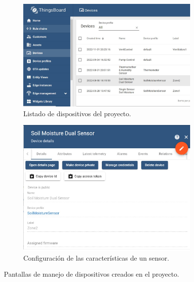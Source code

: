 \begin{figure}[!htpb]
     \centering
     \begin{subfigure}[b]{0.75\textwidth}
		\centering
	    \includegraphics[width=1\textwidth]{./Figures/chapter3/TB_Devices4.jpg}
	    \caption[Listado de dispositivos del proyecto]{Listado de dispositivos del proyecto.}
	    \label{fig:tb_devices3}
     \end{subfigure}
     \hfill
     \begin{subfigure}[b]{0.75\textwidth}
	     \centering
	     \includegraphics[width=1\textwidth]{./Figures/chapter3/TB_Devices5.jpg}
	     \caption[Configuración de las características de un sensor]{Configuración de las características de un sensor.}
	    \label{fig:tb_devices4}
     \end{subfigure}
    \caption[Pantallas de manejo de dispositivos creados en el proyecto]{Pantallas de manejo de dispositivos creados en el proyecto.}
	\label{fig:tb_devices}	
\end{figure}



